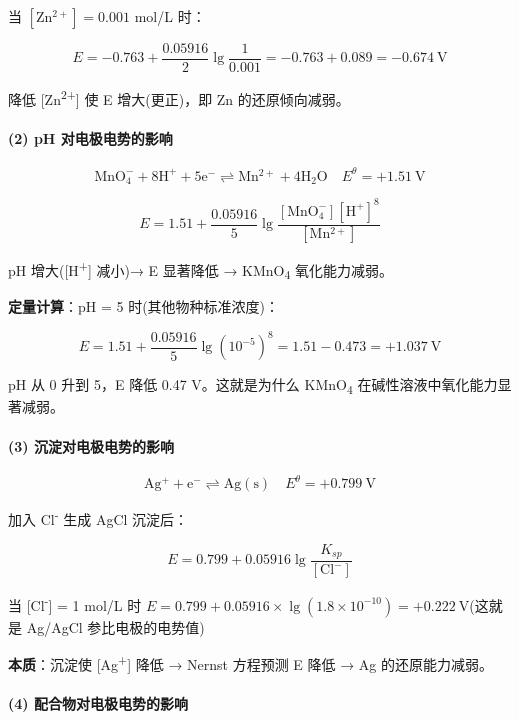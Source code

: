 当 \([\mathrm{Zn^{2+}}] = 0.001\) mol/L 时：

\[
E = -0.763 + \frac{0.05916}{2}\lg\frac{1}{0.001} = -0.763 + 0.089 = -0.674\ \mathrm{V}
\]

降低 {[}Zn\textsuperscript{2+}{]} 使 E 增大(更正)，即 Zn 的还原倾向减弱。

\paragraph{(2) pH 对电极电势的影响}\label{ph-ux5bf9ux7535ux6781ux7535ux52bfux7684ux5f71ux54cd}

\[
\mathrm{MnO_4^- + 8H^+ + 5e^- \rightleftharpoons Mn^{2+} + 4H_2O} \quad E^\theta = +1.51\ \mathrm{V}
\]

\[
E = 1.51 + \frac{0.05916}{5}\lg\frac{[\mathrm{MnO_4^-}][\mathrm{H^+}]^8}{[\mathrm{Mn^{2+}}]}
\]

pH 增大({[}H\textsuperscript{+}{]} 减小)→ E 显著降低 → KMnO\textsubscript{4} 氧化能力减弱。

\textbf{定量计算}：pH = 5 时(其他物种标准浓度)：

\[E = 1.51 + \frac{0.05916}{5}\lg(10^{-5})^8 = 1.51 - 0.473 = +1.037\ \mathrm{V}\]

pH 从 0 升到 5，E 降低 0.47 V。这就是为什么 KMnO\textsubscript{4} 在碱性溶液中氧化能力显著减弱。

\paragraph{(3) 沉淀对电极电势的影响}\label{ux6c89ux6dc0ux5bf9ux7535ux6781ux7535ux52bfux7684ux5f71ux54cd}

\[
\mathrm{Ag^+ + e^- \rightleftharpoons Ag(s)} \quad E^\theta = +0.799\ \mathrm{V}
\]

加入 Cl\textsuperscript{-} 生成 AgCl 沉淀后：

\[
E = 0.799 + 0.05916\lg\frac{K_{sp}}{[\mathrm{Cl^-}]}
\]

当 {[}Cl\textsuperscript{-}{]} = 1 mol/L 时 \(E = 0.799 + 0.05916 \times \lg(1.8 \times 10^{-10}) = +0.222\ \mathrm{V}\)(这就是 Ag/AgCl 参比电极的电势值)

\textbf{本质}：沉淀使 {[}Ag\textsuperscript{+}{]} 降低 → Nernst 方程预测 E 降低 → Ag 的还原能力减弱。

\paragraph{(4) 配合物对电极电势的影响}\label{ux914dux5408ux7269ux5bf9ux7535ux6781ux7535ux52bfux7684ux5f71ux54cd}

